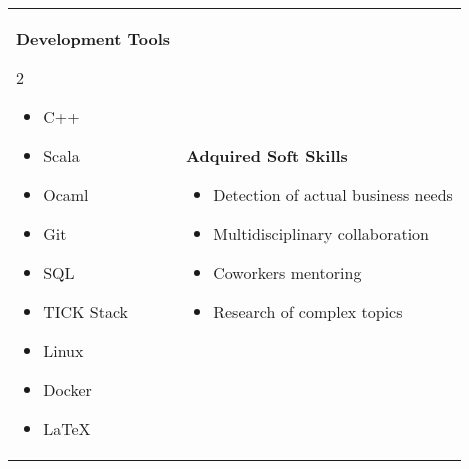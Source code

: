 \documentclass[12pt, letterpaper]{article}
\renewcommand{\large}{\fontsize{14}{20}\selectfont}
\begin{document}
\begin{tabular}[t]{ l l }
		\parbox[t]{0.5\linewidth}{
			{\large \color{base-color} \textbf{Development Tools}}
			\begin{multicols}{2}
				\begin{itemize}[leftmargin=*]
					\setlength\itemsep{0.05em}
					\item[] C++
					\item[] Scala
					\item[] Ocaml
					\item[] Git
					\item[] SQL
					\item[] TICK Stack
					\item[] Linux
					\item[] Docker
					\item[] \LaTeX
				\end{itemize}
			\end{multicols}
		}&
		\parbox[t][][t]{0.5\textwidth}{
			{\large \color{base-color} \textbf{Adquired Soft Skills}}
			\begin{itemize}[leftmargin=*]
				\setlength\itemsep{0.05em}
				\item[] Detection of actual business needs
				\item[] Multidisciplinary collaboration
				\item[] Coworkers mentoring
				\item[] Research of complex topics
			\end{itemize}
		}
	\end{tabular}
\end{document}
